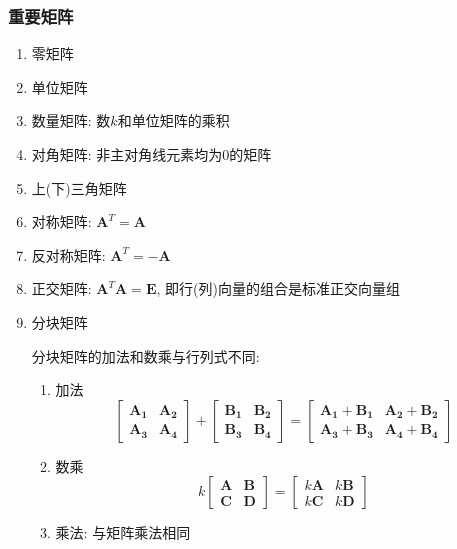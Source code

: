 \subsubsection{重要矩阵}
\begin{enumerate}
	\item 零矩阵
	\item 单位矩阵
	\item 数量矩阵: 数$ k $和单位矩阵的乘积
	\item 对角矩阵: 非主对角线元素均为$ 0 $的矩阵
	\item 上(下)三角矩阵
	\item 对称矩阵: $ \bm{A}^{T}=\bm{A} $
	\item 反对称矩阵: $ \bm{A}^{T}=-\bm{A} $
	\item 正交矩阵: $ \bm{A}^{T}\bm{A}=\bm{E} $, 即行(列)向量的组合是标准正交向量组
	\item 分块矩阵\par
	分块矩阵的加法和数乘与行列式不同:
	\begin{enumerate}
		\item 加法
		\begin{equation*}
			\begin{bmatrix}
				\bm{A_{1}} & \bm{A_{2}} \\ \bm{A_{3}} & \bm{A_{4}}
			\end{bmatrix} + 
		    \begin{bmatrix}
			    \bm{B_{1}} & \bm{B_{2}} \\ \bm{B_{3}} & \bm{B_{4}}
		    \end{bmatrix} = 
	        \begin{bmatrix}
	        	\bm{A_{1}}+\bm{B_{1}} & \bm{A_{2}}+\bm{B_{2}} \\ \bm{A_{3}}+\bm{B_{3}} & \bm{A_{4}}+\bm{B_{4}}
	        \end{bmatrix}
		\end{equation*}
	    \item 数乘
	    \begin{equation*}
	    	k\begin{bmatrix}
	    		\bm{A} & \bm{B} \\ \bm{C} & \bm{D}
	    	\end{bmatrix} = 
    	    \begin{bmatrix}
    	    	k\bm{A} & k\bm{B} \\ k\bm{C} & k\bm{D}
    	    \end{bmatrix}
	    \end{equation*}
        \item 乘法: 与矩阵乘法相同
	\end{enumerate}
\end{enumerate}
